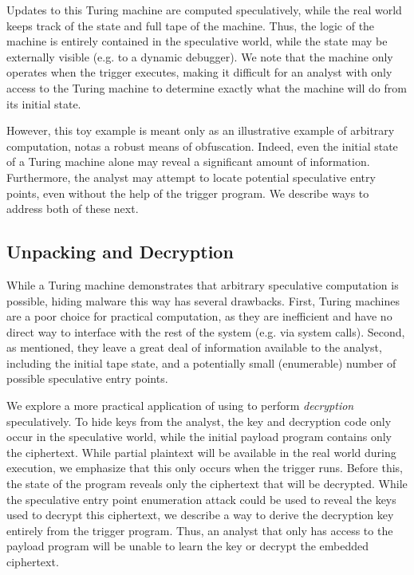 Updates to this Turing machine are computed speculatively, while the real
world keeps track of the state and full tape of the machine. Thus, the logic of
the machine is entirely contained in the speculative world, while the state may
be externally visible (e.g. to a dynamic debugger). We note that the machine
only operates when the trigger executes, making it difficult for an analyst with
only access to the Turing machine to determine exactly what the machine will do
from its initial state.

However, this toy example is meant only as an illustrative example of arbitrary
computation, notas a robust means of obfuscation. Indeed, even the initial state
of a Turing machine alone may reveal a significant amount of information.
Furthermore, the analyst may attempt to locate potential speculative entry
points, even without the help of the trigger program. We describe ways to address
both of these next.


\subsection{Unpacking and Decryption}
\label{subsec:decryption}

While a Turing machine demonstrates that arbitrary speculative computation
is possible, hiding malware this way has several drawbacks. First, Turing
machines are a poor choice for practical computation, as they are inefficient
and have no direct way to interface with the rest of the system (e.g. via system
calls). Second, as mentioned, they leave a great deal of information available
to the analyst, including the initial tape state, and a potentially small
(enumerable) number of possible speculative entry points.

We explore a more practical application of using \speculake to perform
\emph{decryption} speculatively. To hide keys from the analyst, the key and decryption
code only occur in the speculative world, while the initial payload program
contains only the ciphertext. While partial plaintext will be available in the
real world during execution, we emphasize that this only occurs when the trigger
runs. Before this, the state of the program reveals only the ciphertext that
will be decrypted. While the speculative entry point enumeration attack could be
used to reveal the keys used to decrypt this ciphertext, we describe a way to
derive the decryption key entirely from the trigger program. Thus, an analyst
that only has access to the payload program will be unable to learn the key or
decrypt the embedded ciphertext.

